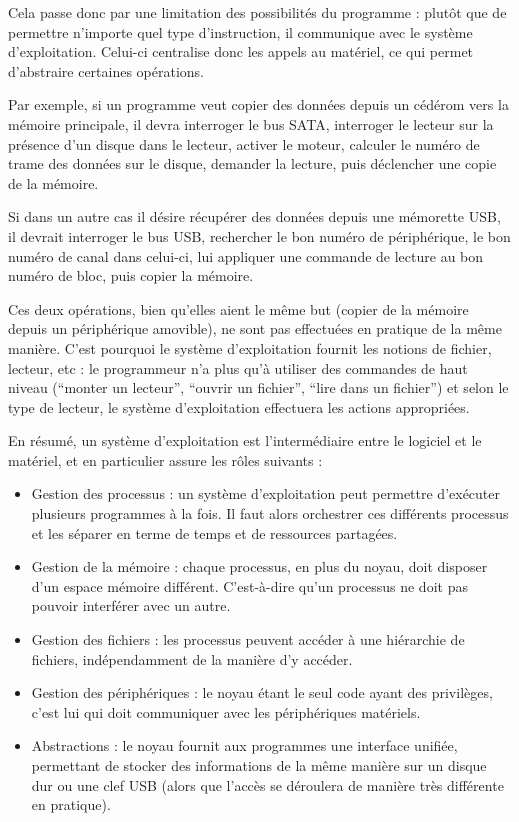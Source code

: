 Cela passe donc par une limitation des possibilités du programme : plutôt que de
permettre n'importe quel type d'instruction, il communique avec le système
d'exploitation. Celui-ci centralise donc les appels au matériel, ce qui permet
d'abstraire certaines opérations.

Par exemple, si un programme veut copier des données depuis un cédérom vers la
mémoire principale, il devra interroger le bus SATA, interroger le lecteur sur
la présence d'un disque dans le lecteur, activer le moteur, calculer le numéro
de trame des données sur le disque, demander la lecture, puis déclencher une
copie de la mémoire.

Si dans un autre cas il désire récupérer des données depuis une mémorette USB,
il devrait interroger le bus USB, rechercher le bon numéro de périphérique, le
bon numéro de canal dans celui-ci, lui appliquer une commande de lecture au bon
numéro de bloc, puis copier la mémoire.

Ces deux opérations, bien qu'elles aient le même but (copier de la mémoire
depuis un périphérique amovible), ne sont pas effectuées en pratique de la même
manière. C'est pourquoi le système d'exploitation fournit les notions de
fichier, lecteur, etc : le programmeur n'a plus qu'à utiliser des commandes de
haut niveau (``monter un lecteur'', ``ouvrir un fichier'', ``lire dans un
fichier'') et selon le type de lecteur, le système d'exploitation effectuera les
actions appropriées.

En résumé, un système d'exploitation est l'intermédiaire entre le logiciel et
le matériel, et en particulier assure les rôles suivants :


\begin{itemize}
\item
  Gestion des processus : un système d'exploitation peut permettre
  d'exécuter plusieurs programmes à la fois. Il faut alors orchestrer
  ces différents processus et les séparer en terme de temps et de
  ressources partagées.
\item
  Gestion de la mémoire : chaque processus, en plus du noyau, doit
  disposer d'un espace mémoire différent. C'est-à-dire qu'un processus
  ne doit pas pouvoir interférer avec un autre.
\item
  Gestion des fichiers : les processus peuvent accéder à une hiérarchie de
  fichiers, indépendamment de la manière d'y accéder.
\item
  Gestion des périphériques : le noyau étant le seul code ayant des privilèges,
  c'est lui qui doit communiquer avec les périphériques matériels.
\item
  Abstractions : le noyau fournit aux programmes une interface unifiée,
  permettant de stocker des informations de la même manière sur un
  disque dur ou une clef USB (alors que l'accès se déroulera de manière
  très différente en pratique).
\end{itemize}

